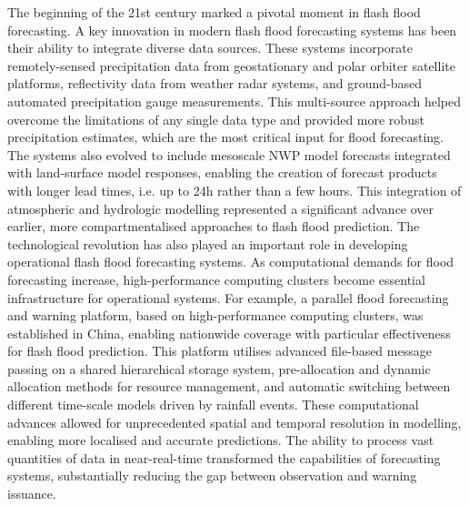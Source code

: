 The beginning of the 21st century marked a pivotal moment in flash flood forecasting. A key innovation in modern flash flood forecasting systems has been their ability to integrate diverse data sources. These systems incorporate remotely-sensed precipitation data from geostationary and polar orbiter satellite platforms, reflectivity data from weather radar systems, and ground-based automated precipitation gauge measurements. This multi-source approach helped overcome the limitations of any single data type and provided more robust precipitation estimates, which are the most critical input for flood forecasting. The systems also evolved to include mesoscale NWP model forecasts integrated with land-surface model responses, enabling the creation of forecast products with longer lead times, i.e. up to 24h rather than a few hours. This integration of atmospheric and hydrologic modelling represented a significant advance over earlier, more compartmentalised approaches to flash flood prediction. The technological revolution has also played an important role in developing operational flash flood forecasting systems. As computational demands for flood forecasting increase, high-performance computing clusters become essential infrastructure for operational systems. For example, a parallel flood forecasting and warning platform, based on high-performance computing clusters, was established in China, enabling nationwide coverage with particular effectiveness for flash flood prediction. This platform utilises advanced file-based message passing on a shared hierarchical storage system, pre-allocation and dynamic allocation methods for resource management, and automatic switching between different time-scale models driven by rainfall events. These computational advances allowed for unprecedented spatial and temporal resolution in modelling, enabling more localised and accurate predictions. The ability to process vast quantities of data in near-real-time transformed the capabilities of forecasting systems, substantially reducing the gap between observation and warning issuance.


